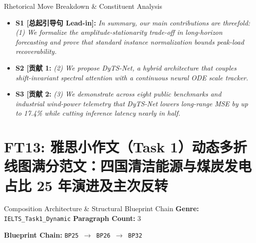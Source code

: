 \begin{TipBox}{Rhetorical Move Breakdown \& Constituent Analysis}
\begin{itemize}[leftmargin=1.5em]
  \item \textbf{S1 [总起引导句 Lead-in]:} \textit{In summary, our main contributions are threefold: (1) We formalize the amplitude-stationarity trade-off in long-horizon forecasting and prove that standard instance normalization bounds peak-load recoverability.}\par{}
  \item \textbf{S2 [贡献 1:} \textit{(2) We propose DyTS-Net, a hybrid architecture that couples shift-invariant spectral attention with a continuous neural ODE scale tracker.}\par{}
  \item \textbf{S3 [贡献 2:} \textit{(3) We demonstrate across eight public benchmarks and industrial wind-power telemetry that DyTS-Net lowers long-range MSE by up to 17.4\% while cutting inference latency nearly in half.}\par{}
\end{itemize}
\end{TipBox}
\medskip
\clearpage
\section{FT13: 雅思小作文（Task 1）动态多折线图满分范文：四国清洁能源与煤炭发电占比 25 年演进及主次反转}\label{comp:FT13}
\begin{ConceptBox}{Composition Architecture \& Structural Blueprint Chain}
\textbf{Genre:} \texttt{IELTS\_Task1\_Dynamic} \quad \textbf{Paragraph Count:} 3\par
\textbf{Blueprint Chain:} \texttt{BP25 $\to$ BP26 $\to$ BP32}
\end{ConceptBox}
